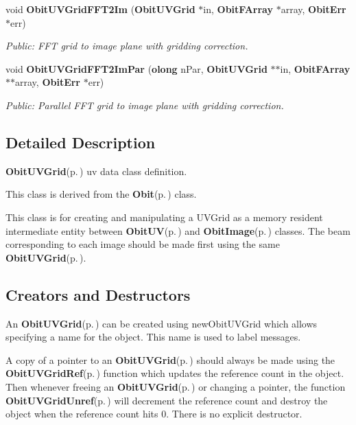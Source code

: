 \begin{CompactItemize}
void {\bf Obit\-UVGrid\-FFT2Im} ({\bf Obit\-UVGrid} $\ast$in, {\bf Obit\-FArray} $\ast$array, {\bf Obit\-Err} $\ast$err)
\begin{CompactList}\small\item\em Public: FFT grid to image plane with gridding correction. \item\end{CompactList}\item 
void {\bf Obit\-UVGrid\-FFT2Im\-Par} ({\bf olong} n\-Par, {\bf Obit\-UVGrid} $\ast$$\ast$in, {\bf Obit\-FArray} $\ast$$\ast$array, {\bf Obit\-Err} $\ast$err)
\begin{CompactList}\small\item\em Public: Parallel FFT grid to image plane with gridding correction. \item\end{CompactList}\end{CompactItemize}


\subsection{Detailed Description}
{\bf Obit\-UVGrid}{\rm (p.\,\pageref{structObitUVGrid})} uv data class definition. 

This class is derived from the {\bf Obit}{\rm (p.\,\pageref{structObit})} class.

This class is for creating and manipulating a UVGrid as a memory resident intermediate entity between {\bf Obit\-UV}{\rm (p.\,\pageref{structObitUV})} and {\bf Obit\-Image}{\rm (p.\,\pageref{structObitImage})} classes. The beam corresponding to each image should be made first using the same {\bf Obit\-UVGrid}{\rm (p.\,\pageref{structObitUVGrid})}.\subsection{Creators and Destructors}\label{ObitUVGrid_8h_ObitUVGridaccess}
An {\bf Obit\-UVGrid}{\rm (p.\,\pageref{structObitUVGrid})} can be created using new\-Obit\-UVGrid which allows specifying a name for the object. This name is used to label messages.

A copy of a pointer to an {\bf Obit\-UVGrid}{\rm (p.\,\pageref{structObitUVGrid})} should always be made using the {\bf Obit\-UVGrid\-Ref}{\rm (p.\,\pageref{ObitUVGrid_8h_a1})} function which updates the reference count in the object. Then whenever freeing an {\bf Obit\-UVGrid}{\rm (p.\,\pageref{structObitUVGrid})} or changing a pointer, the function {\bf Obit\-UVGrid\-Unref}{\rm (p.\,\pageref{ObitUVGrid_8h_a0})} will decrement the reference count and destroy the object when the reference count hits 0. There is no explicit destructor.

